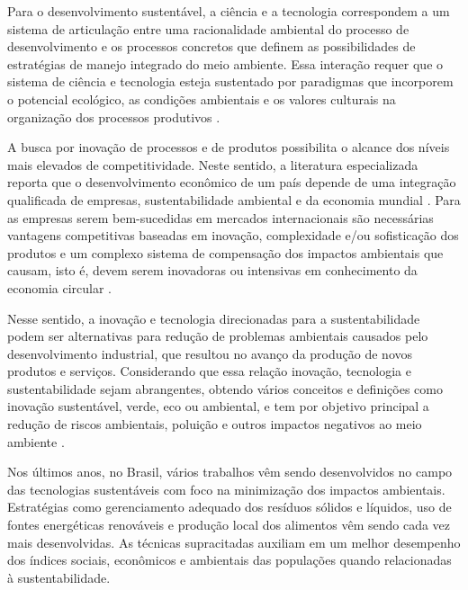 Para o desenvolvimento sustentável, a ciência e a tecnologia correspondem a um sistema de articulação entre uma racionalidade ambiental do processo de desenvolvimento e os processos concretos que definem as possibilidades de estratégias de manejo integrado do meio ambiente. Essa interação requer que o sistema de ciência e tecnologia esteja sustentado por paradigmas que incorporem o potencial ecológico, as condições ambientais e os valores culturais na organização dos processos produtivos \cite{furlan_gestao_2018}.

A busca por inovação de processos e de produtos possibilita o alcance dos níveis mais elevados de competitividade. Neste sentido, a literatura especializada reporta que o desenvolvimento econômico de um país depende de uma integração qualificada de empresas, sustentabilidade ambiental e da economia mundial \cite{swinburn_desenvolvimento_2006}. Para as empresas serem bem-sucedidas em mercados internacionais são necessárias vantagens competitivas baseadas em inovação, complexidade e/ou sofisticação dos produtos e um complexo sistema de compensação dos impactos ambientais que causam, isto é, devem serem inovadoras ou intensivas em conhecimento da economia circular \cite{lucas_desenvolvimento_2019}.


Nesse sentido, a inovação e tecnologia direcionadas para a sustentabilidade podem ser alternativas para redução de problemas ambientais causados pelo desenvolvimento industrial, que resultou no avanço da produção de novos produtos e serviços. Considerando que essa relação inovação, tecnologia e sustentabilidade sejam abrangentes, obtendo vários conceitos e definições como inovação sustentável, verde, eco ou ambiental, e tem por objetivo principal a redução de riscos ambientais, poluição e outros impactos negativos ao meio ambiente
\cite{pinsky_inovacao_2017}.  

Nos últimos anos, no Brasil, vários trabalhos vêm sendo desenvolvidos no campo das tecnologias sustentáveis com foco na minimização dos impactos ambientais. Estratégias como gerenciamento adequado dos resíduos sólidos e líquidos, uso de fontes energéticas renováveis e produção local dos alimentos vêm sendo cada vez mais desenvolvidas. As técnicas supracitadas auxiliam em um melhor desempenho dos índices sociais, econômicos e ambientais das populações quando relacionadas à sustentabilidade.

